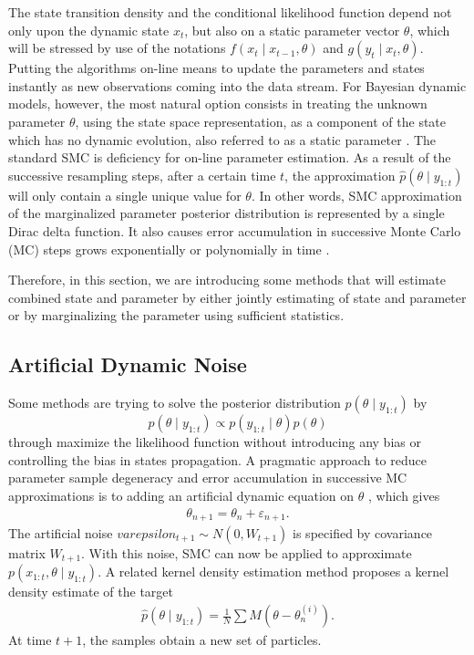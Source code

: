 The state transition density and the conditional likelihood function depend not only upon the dynamic state $x_t$, but also on a static parameter vector $\theta$, which will be stressed by use of the notations $f(x_t \mid x_{t-1},\theta)$ and $g(y_t\mid x_t,\theta)$. Putting the algorithms on-line means to update the parameters and states instantly as new observations coming into the data stream. For Bayesian dynamic models, however, the most natural option consists in treating the unknown parameter $\theta$, using the state space representation, as a component of the state which has no dynamic evolution, also referred to as a static parameter \cite{cappe2007overview}. The standard SMC is deficiency for on-line parameter estimation. As a result of the successive resampling steps, after a certain time $t$, the approximation $\hat{p}(\theta\mid y_{1:t})$ will only contain a single unique value for $\theta$. In other words, SMC approximation of the marginalized parameter posterior distribution is represented by a single Dirac delta function. It also causes error accumulation in successive Monte Carlo (MC) steps grows exponentially or polynomially in time \cite{kantas2009overview}. 

Therefore, in this section, we are introducing some methods that will estimate combined state and parameter by either jointly estimating of state and parameter or by marginalizing the parameter using sufficient statistics. 





\subsection{Artificial Dynamic Noise}\label{ArtificialNoise}

Some methods are trying to solve the posterior distribution $p(\theta \mid y_{1:t})$ by 
\begin{equation}
p(\theta \mid y_{1:t}) \propto p(y_{1:t} \mid \theta ) p(\theta )
\end{equation}
through maximize the likelihood function without introducing any bias or controlling the bias in states propagation. A pragmatic approach to reduce parameter sample degeneracy and error accumulation in successive MC approximations is to adding an artificial dynamic equation on $\theta$ \cite{higuchi2001self} \cite{kitagawa1998self}, which gives
\begin{align*}
\theta_{n+1} = \theta_n+\varepsilon_{n+1}.
\end{align*}
The artificial noise $varepsilon_{t+1}\sim N(0,W_{t+1})$ is specified by covariance matrix $W_{t+1}$. With this noise, SMC can now be applied to approximate $p(x_{1:t},\theta\mid y_{1:t})$. A related kernel density estimation method proposes a kernel density estimate of the target \cite{liu2001combined} \begin{align*}
\hat{p}(\theta\mid y_{1:t}) = \frac{1}{N}\sum M(\theta-\theta_n^{(i)}). 
\end{align*} 
At time $t+1$, the samples obtain a new set of particles. 


